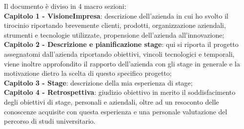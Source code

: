 Il documento è diviso in 4 macro sezioni:\\
\textbf{Capitolo 1 - VisioneImpresa}: descrizione dell'azienda in cui ho svolto il tirocinio riportando brevemente clienti, prodotti, organizzazione aziendali, strumenti e 
tecnologie utilizzate, propensione dell'azienda all'innovazione;\\
\textbf{Capitolo 2 - Descrizione e pianificazione stage}: qui si riporta il progetto assegnatomi dall'azienda riportando obiettivi, vincoli tecnologici e temporali, viene 
inoltre approfondito il rapporto dell'azienda con gli stage in generale e la motivazione dietro la scelta di questo specifico progetto;\\
\textbf{Capitolo 3 - Stage}: descrizione della mia esperienza di stage;\\
\textbf{Capitolo 4 - Retrospettiva}: giudizio obiettivo in merito il soddisfacimento degli obiettivi di stage, personali e aziendali, oltre 
ad un resoconto delle conoscenze acquisite con questa esperienza e una personale valutazione del percorso di studi universitario.


\endgroup
\vfill
